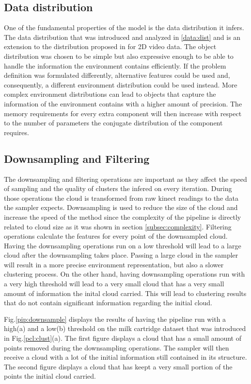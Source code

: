 \documentclass[twoside,hidelinks]{article}
\begin{document}
 
\subsection{Data distribution}

One of the fundamental properties of the model is the data distribution it infers. 
The data distribution that was introduced and analyzed in \ref{data:dist} and is an extension to the distribution proposed in \cite{dependentDiri} for 2D video data.
The object distribution was chosen to be simple but also expressive enough to be able to handle the information the environment contains efficiently.
If the problem definition was formulated differently, alternative features could be used and, consequently, a different environment distribution could be used instead.
More complex environment distributions can lead to objects that capture the information of the environment contains with a higher amount of precision. 
The memory requirements for every extra component will then increase with respect to the number of parameters the conjugate distribution of the component requires. 
 
\subsection{Downsampling and Filtering}

The downsampling and filtering operations are important as they affect the speed of sampling and the quality of clusters the infered on every iteration. 
During those operations the cloud is transformed from raw kinect readings to the data the sampler expects.
Downsampling is used to reduce the size of the cloud and increase the speed of the method since the complexity of the pipeline is directly related to cloud size as it was shown in section \ref{subsec:complexity}. Filtering operations calculate the features for every point of the downsampled cloud.
Having the downsampling operations run on a low threshold will lead to a large cloud after the downsampling takes place. 
Passing a large cloud in the sampler will result in a more precise environment representation, but also a slower clustering process.
On the other hand, having downsampling operations run with a very high threshold will lead to a very small cloud that has a very small amount of information the inital cloud carried. This will lead to clustering results that do not contain significant information regarding the initial cloud.

Fig.\ref{pip:downsample} displays the results of having the pipeline run with a high(a) and a low(b) threshold on the milk cartridge dataset that was introduced in Fig.\ref{pcl:clust}(a).
The first figure displays a cloud that has a small amount of points removed during the downsampling operations. The sampler will then receive a cloud with a lot of the initial information still contained in its structure.
The second figure displays a cloud that has keept a very small portion of the points the initial cloud carried.
\end{document}
